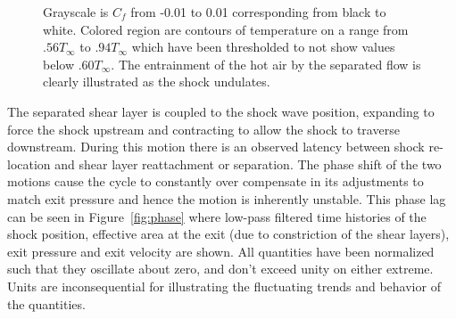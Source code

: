 \documentclass[]{aiaa-tc}%
\begin{document}
\begin{figure}
  \centering
  
  \hspace{0.1in}	            
  \hspace{0.1in}	
  
  
  \hspace{0.1in}	            
  \hspace{0.1in}	
  
  
  \hspace{0.1in}	            
  \hspace{0.1in}	
  
  \caption{Grayscale is $C_f$ from -0.01 to 0.01 corresponding from black to white.  Colored region are contours of temperature on a range from $.56T_{\infty}$ to $.94T_{\infty}$ which have been thresholded to not show values below $.60T_{\infty}$.  The entrainment of the hot air by the separated flow is clearly illustrated as the shock undulates.  }
  
  \label{fig:whistory}
\end{figure}

The separated shear layer is coupled to the shock wave position, expanding to force the shock upstream and contracting to allow the shock to traverse downstream.  During this motion there is an observed latency between shock re-location and shear layer reattachment or separation.  The phase shift of the two motions cause the cycle to constantly over compensate in its adjustments to match exit pressure and hence the motion is inherently unstable.  This phase lag can be seen in Figure~\ref{fig:phase} where low-pass filtered time histories of the shock position, effective area at the exit (due to constriction of the shear layers), exit pressure and exit velocity are shown.  All quantities have been normalized such that they oscillate about zero, and don't exceed unity on either extreme.  Units are inconsequential for illustrating the fluctuating trends and behavior of the quantities.
\end{document}

